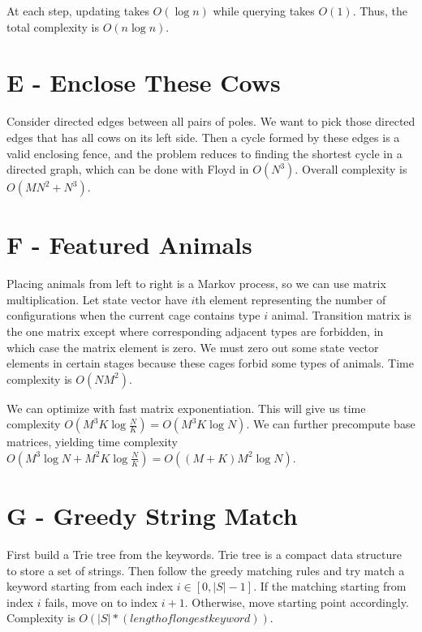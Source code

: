 \documentclass{article}
\begin{document}
At each step, updating takes $O(\log{n})$ while querying takes $O(1)$. Thus, the total complexity is $O(n\log{n})$.


\section*{E - Enclose These Cows}
Consider directed edges between all pairs of poles. We want to pick those directed edges that has all cows on its left side. Then a cycle formed by these edges is a valid enclosing fence, and the problem reduces to finding the shortest cycle in a directed graph, which can be done with Floyd in $O(N^3)$. Overall complexity is $O(M N^2 + N^3)$. 

\section*{F - Featured Animals}

Placing animals from left to right is a Markov process, so we can use matrix multiplication. Let state vector have $i$th element representing the number of configurations when the current cage contains type $i$ animal. Transition matrix is the one matrix except where corresponding adjacent types are forbidden, in which case the matrix element is zero. We must zero out some state vector elements in certain stages because these cages forbid some types of animals. Time complexity is $O(N M^2)$. 

We can optimize with fast matrix exponentiation. This will give us time complexity $O(M^3 K \log{\frac{N}{K}}) = O(M^3 K \log{N})$. We can further precompute base matrices, yielding time complexity $O(M^3 \log{N} + M^2 K \log{\frac{N}{K}}) = O((M+K) M^2 \log{N})$. 

\section*{G - Greedy String Match}

First build a Trie tree from the keywords. Trie tree is a compact data structure to store a set of strings. Then follow the greedy matching rules and try match a keyword starting from each index $i \in [0, |S|-1]$. If the matching starting from index $i$ fails, move on to index $i+1$. Otherwise, move starting point accordingly. Complexity is $O(|S| * (length of longest keyword))$. 
\end{document}
